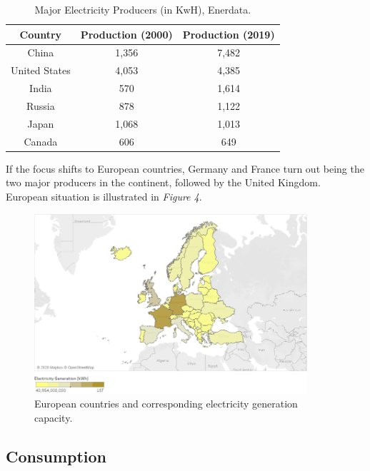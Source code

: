 \documentclass{book}
\begin{document}
\bigskip
\begin{table}[H]
\begin{center}
\begin{tabular}{|c|c|c|}
\hline
Country & Production (2000) & Production (2019)\\
\hline
China & 1,356 & 7,482\\
United States & 4,053 & 4,385\\
India & 570 & 1,614\\
Russia & 878 & 1,122\\
Japan & 1,068 & 1,013\\
Canada & 606 & 649\\
\hline
\end{tabular}
\caption{Major Electricity Producers (in KwH), Enerdata.}
\end{center}
\end{table}

If the focus shifts to European countries, Germany and France turn out being the two major producers in the continent, followed by the United Kingdom. European situation is illustrated in \textit{Figure 4}.

\bigskip
\begin{figure}[H]
\begin{center}
\captionsetup{justification=centering}
\includegraphics[width=0.9\textwidth]{Images/prod.png}
\caption{European countries and corresponding electricity generation capacity. }
\end{center}
\end{figure}
\bigskip

\subsection*{Consumption}
\end{document}
